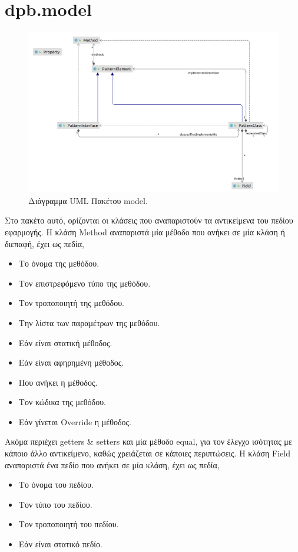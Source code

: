 \section{dpb.model}
\label{sec:dpb.model}
\begin{figure}[H]
    \centering
    \includegraphics[width=1.0\textwidth]{Figures/model.png}
    \caption{Διάγραμμα UML Πακέτου model.}
    \label{fig:modelUML}
\end{figure}
Στο πακέτο αυτό, ορίζονται οι κλάσεις που αναπαριστούν τα αντικείμενα του πεδίου εφαρμογής.
\newline
Η κλάση Method αναπαριστά μία μέθοδο που ανήκει σε μία κλάση ή διεπαφή, έχει ως πεδία,
\begin{itemize}
    \item Το όνομα της μεθόδου.
    \item Τον επιστρεφόμενο τύπο της μεθόδου.
    \item Τον τροποποιητή της μεθόδου.
    \item Την λίστα των παραμέτρων της μεθόδου.
    \item Εάν είναι στατική μέθοδος.
    \item Εάν είναι αφηρημένη μέθοδος.
    \item Που ανήκει η μέθοδος.
    \item Τον κώδικα της μεθόδου.
    \item Εάν γίνεται Override η μέθοδος.
\end{itemize}
Ακόμα περιέχει getters \& setters και μία μέθοδο equal, για τον έλεγχο ισότητας με κάποιο άλλο αντικείμενο, 
καθώς χρειάζεται σε κάποιες περιπτώσεις.
\newline
Η κλάση Field αναπαριστά ένα πεδίο που ανήκει σε μία κλάση, έχει ως πεδία,
\begin{itemize}
    \item Το όνομα του πεδίου.
    \item Τον τύπο του πεδίου.
    \item Τον τροποποιητή του πεδίου.
    \item Εάν είναι στατικό πεδίο.
\end{itemize}
